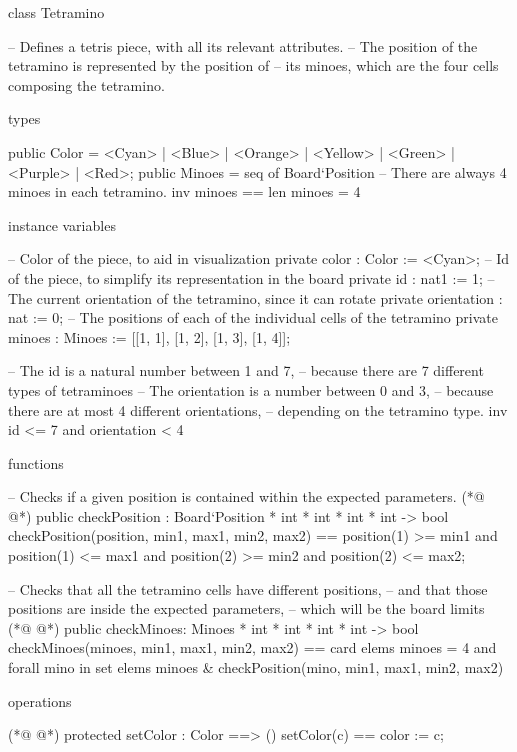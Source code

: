 \begin{vdmpp}[breaklines=true]
class Tetramino

 -- Defines a tetris piece, with all its relevant attributes.
 -- The position of the tetramino is represented by the position of 
 -- its minoes, which are the four cells composing the tetramino.


 types

  public Color = <Cyan> | <Blue> | <Orange> 
   | <Yellow> | <Green> | <Purple> | <Red>;
  public Minoes = seq of Board`Position
  -- There are always 4 minoes in each tetramino.
  inv minoes == len minoes = 4 


 instance variables
 
  -- Color of the piece, to aid in visualization
  private color  : Color  := <Cyan>;
  -- Id of the piece, to simplify its representation in the board
  private id   : nat1   := 1;
  -- The current orientation of the tetramino, since it can rotate
  private orientation : nat   := 0;
  -- The positions of each of the individual cells of the tetramino
  private minoes  : Minoes := [[1, 1], [1, 2], [1, 3], [1, 4]];
 
  -- The id is a natural number between 1 and 7,
  -- because there are 7 different types of tetraminoes
  -- The orientation is a number between 0 and 3,
  -- because there are at most 4 different orientations,
  -- depending on the tetramino type.
  inv id <= 7 and orientation < 4
  
 
 functions
 
  -- Checks if a given position is contained within the expected parameters.
(*@
\label{checkPosition:39}
@*)
  public checkPosition : Board`Position * int * int * int * int -> bool
  checkPosition(position, min1, max1, min2, max2) == 
   position(1) >= min1
   and position(1) <= max1 
   and position(2) >= min2
   and position(2) <= max2;
  
  -- Checks that all the tetramino cells have different positions,
  -- and that those positions are inside the expected parameters,
  -- which will be the board limits 
(*@
\label{checkMinoes:49}
@*)
  public checkMinoes: Minoes * int * int * int * int -> bool
  checkMinoes(minoes, min1, max1, min2, max2) ==
   card elems minoes = 4 
   and forall mino in set elems minoes & 
    checkPosition(mino, min1, max1, min2, max2)
 
 
 operations
  
(*@
\label{setColor:58}
@*)
  protected setColor : Color ==> ()
  setColor(c) == color := c;
  

\end{vdmpp}
